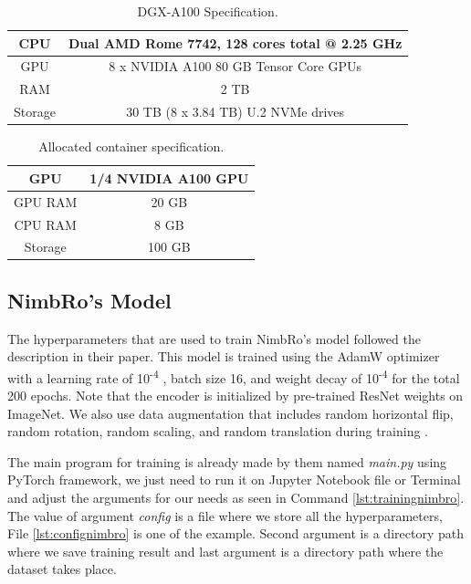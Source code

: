 \begin{longtable}{|c|c|}
  \caption{DGX-A100 Specification.}
  \label{tb:dgxa100}\\
  \hline
  CPU     & Dual AMD Rome 7742, 128 cores total @ 2.25 GHz \\
  \hline
  GPU     & 8 x NVIDIA A100 80 GB Tensor Core GPUs  \\
  \hline
  RAM     & 2 TB \\
  \hline
  Storage & 30 TB (8 x 3.84 TB) U.2 NVMe drives \\
  \hline
\end{longtable}

\begin{longtable}{|c|c|}
  \caption{Allocated container specification.}
  \label{tb:allocatedcontainer}\\
  \hline
  GPU     & 1/4 NVIDIA A100 GPU \\
  \hline
  GPU RAM & 20 GB  \\
  \hline
  CPU RAM & 8 GB \\
  \hline
  Storage & 100 GB  \\
  \hline
\end{longtable}

\subsection{NimbRo's Model}
\label{subsec:trainingnimbromodel}

The hyperparameters that are used to train NimbRo's model followed the description in their paper.
This model is trained using the AdamW optimizer with a learning rate of 10\textsuperscript{-4} ,
batch size 16, and weight decay of 10\textsuperscript{-4} for the total 200 epochs.
Note that the encoder is initialized by pre-trained ResNet weights on ImageNet.
We also use data augmentation that includes random horizontal flip, random
rotation, random scaling, and random translation during training \parencite{amini2021}.

The main program for training is already made by them named \emph{main.py} using PyTorch framework, we just need to run it on Jupyter Notebook file or Terminal and adjust the arguments for our needs
as seen in Command \ref{lst:trainingnimbro}. The value of argument \emph{config} is a file where we store all the hyperparameters, File \ref{lst:confignimbro} is one of the example.
Second argument is a directory path where we save training result and last argument is a directory path where the dataset takes place.

